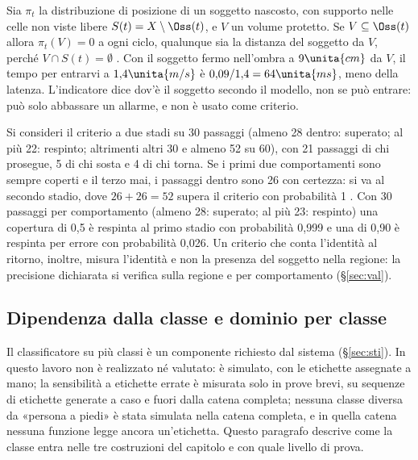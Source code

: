 \begin{osservazione}\label{oss:occ-intrusione}
Sia $\pi_t$ la distribuzione di posizione di un soggetto nascosto, con supporto nelle celle non viste libere $S(t)=X\setminus\Oss(t)$, e $V$ un volume protetto. Se $V\subseteq\Oss(t)$ allora $\pi_t(V)=0$ a ogni ciclo, qualunque sia la distanza del soggetto da $V$, perché $V\cap S(t)=\emptyset$ . Con il soggetto fermo nell'ombra a $9\unita{cm}$ da $V$, il tempo per entrarvi a $1{,}4\unita{m/s}$ è $0{,}09/1{,}4=64\unita{ms}$, meno della latenza. L'indicatore dice dov'è il soggetto secondo il modello, non se può entrare: può solo abbassare un allarme, e non è usato come criterio.
\end{osservazione}

\begin{osservazione}\label{oss:occ-criterio}
Si consideri il criterio a due stadi su 30 passaggi (almeno 28 dentro: superato; al più 22: respinto; altrimenti altri 30 e almeno 52 su 60), con 21 passaggi di chi prosegue, 5 di chi sosta e 4 di chi torna. Se i primi due comportamenti sono sempre coperti e il terzo mai, i passaggi dentro sono 26 con certezza: si va al secondo stadio, dove $26+26=52$ supera il criterio con probabilità 1 . Con 30 passaggi per comportamento (almeno 28: superato; al più 23: respinto) una copertura di 0,5 è respinta al primo stadio con probabilità 0,999 e una di 0,90 è respinta per errore con probabilità 0,026. Un criterio che conta l'identità al ritorno, inoltre, misura l'identità e non la presenza del soggetto nella regione: la precisione dichiarata si verifica sulla regione e per comportamento (\S\ref{sec:val}).
\end{osservazione}

\subsection{Dipendenza dalla classe e dominio per classe}\label{sec:occ-classe}

Il classificatore su più classi è un componente richiesto dal sistema (\S\ref{sec:sti}). In questo lavoro non è realizzato né valutato: è simulato, con le etichette assegnate a mano; la sensibilità a etichette errate è misurata solo in prove brevi, su sequenze di etichette generate a caso e fuori dalla catena completa; nessuna classe diversa da «persona a piedi» è stata simulata nella catena completa, e in quella catena nessuna funzione legge ancora un'etichetta. Questo paragrafo descrive come la classe entra nelle tre costruzioni del capitolo e con quale livello di prova.

